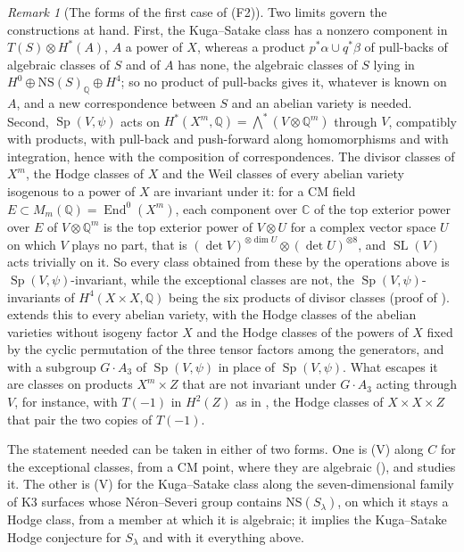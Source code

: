 \documentclass[11pt,reqno]{amsart}
\theoremstyle{plain}
\theoremstyle{definition}
\theoremstyle{remark}
\newtheorem{remark}[theorem]{Remark}
\newcommand{\QQ}{\mathbb{Q}}
\newcommand{\CC}{\mathbb{C}}
\newcommand{\NS}{\mathrm{NS}}
\DeclareMathOperator{\End}{End}
\DeclareMathOperator{\SL}{SL}
\DeclareMathOperator{\Sp}{Sp}
\begin{document}
\begin{remark}[The forms of the first case of (F2)]
Two limits govern the constructions at hand.
First, the Kuga--Satake class has a nonzero component in $T(S)\otimes
H^{*}(A)$, $A$ a power of $X$, whereas a product $p^{*}\alpha\cup q^{*}\beta$
of pull-backs of algebraic classes of $S$ and of $A$ has none, the algebraic
classes of $S$ lying in $H^{0}\oplus\NS(S)_{\QQ}\oplus H^{4}$; so no product
of pull-backs gives it, whatever is known on $A$, and a new correspondence
between $S$ and an abelian variety is needed. Second, $\Sp(V,\psi)$ acts on
$H^{*}(X^{m},\QQ)=\bigwedge^{*}(V\otimes\QQ^{m})$ through $V$, compatibly with
products, with pull-back and push-forward along homomorphisms and with
integration, hence with the composition of correspondences. The divisor
classes of $X^{m}$, the Hodge classes of $X$ and the Weil classes of every
abelian variety isogenous to a power of $X$ are invariant under it: for a CM
field $E\subset M_{m}(\QQ)=\End^{0}(X^{m})$, each component over $\CC$ of
the top exterior power over $E$ of $V\otimes\QQ^{m}$ is the top exterior power
of $V\otimes U$ for a complex vector space $U$ on which $V$ plays no part,
that is $(\det V)^{\otimes\dim U}\otimes(\det U)^{\otimes8}$, and $\SL(V)$ acts
trivially on it. So every class obtained from these by the operations
above is $\Sp(V,\psi)$-invariant, while the exceptional classes are not, the
$\Sp(V,\psi)$-invariants of $H^{4}(X\times X,\QQ)$ being the six products of
divisor classes (proof of ).
 extends this to every abelian variety, with the
Hodge classes of the abelian varieties without isogeny factor $X$ and the
Hodge classes of the powers of $X$ fixed by the cyclic permutation of the
three tensor factors among the generators, and with a subgroup $G\cdot A_{3}$
of $\Sp(V,\psi)$ in place of $\Sp(V,\psi)$. What escapes it are classes on
products $X^{m}\times Z$ that are not invariant under $G\cdot A_{3}$ acting
through $V$, for instance, with $T(-1)$ in $H^{2}(Z)$ as in
, the Hodge classes of $X\times X\times Z$ that pair
the two copies of $T(-1)$.

The statement needed can be taken in either of two forms. One is \textup{(V)} along $C$ for the exceptional classes, from a
CM point, where they are algebraic (), and
 studies it. The other
is \textup{(V)} for the Kuga--Satake class along the seven-dimensional family
of K3 surfaces whose N\'eron--Severi group contains $\NS(S_{\lambda})$, on
which it stays a Hodge class, from a member at which it is algebraic; it
implies the Kuga--Satake Hodge conjecture for $S_{\lambda}$ and with it
everything above.


\end{remark}
\end{document}
